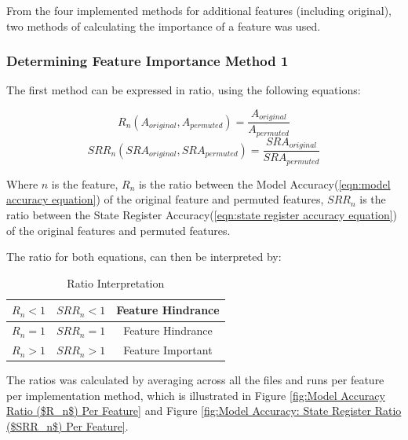 \documentclass{tum-book}
\begin{document}
        \bigskip\noindent
        From the four implemented methods for additional features (including original), two methods of calculating the importance of a feature was used. 
        
        \subsubsection{Determining Feature Importance Method 1}\label{subsection:determining feature importance 1}
        The first method can be expressed in ratio, using the following equations:
        
        \begin{equation}
            \label{eqn:ratio model accuracy}
            R_n(A_{original}, A_{permuted})= \frac{A_{original}}{A_{permuted}}
        \end{equation}
        \begin{equation}
            \label{ration state register accuracy}
            SRR_n(SRA_{original}, SRA_{permuted})= \frac{SRA_{original}}{SRA_{permuted}}
        \end{equation}
        
        \bigskip\noindent
        Where $n$ is the feature, $R_n$ is the ratio between the Model Accuracy(\ref{eqn:model accuracy equation}) of the original feature and permuted features, $SRR_n$ is the ratio between the State Register Accuracy(\ref{eqn:state register accuracy equation}) of the original features and permuted features.
        
        \bigskip\noindent
        The ratio for both equations, can then be interpreted by:
                \begin{table}[ht]
                    \centering
                    \begin{tabular}{|c|c|c|}
                    \hline
                    $R_n<1$ & $SRR_n<1$ & Feature Hindrance\\
                    \hline
                    $R_n=1$ & $SRR_n=1$ & Feature Hindrance\\
                    \hline
                    $R_n>1$ & $SRR_n>1$ & Feature Important\\
                    \hline
                    \end{tabular}
                    \caption{Ratio Interpretation}
                    \label{tab: Ratio Interpretation}
                \end{table}
    
        \bigskip\noindent
        The ratios was calculated by averaging across all the files and runs per feature per implementation method, which is illustrated in Figure \ref{fig:Model Accuracy Ratio ($R_n$) Per Feature} and Figure \ref{fig:Model Accuracy: State Register Ratio ($SRR_n$) Per Feature}.
        
\end{document}
